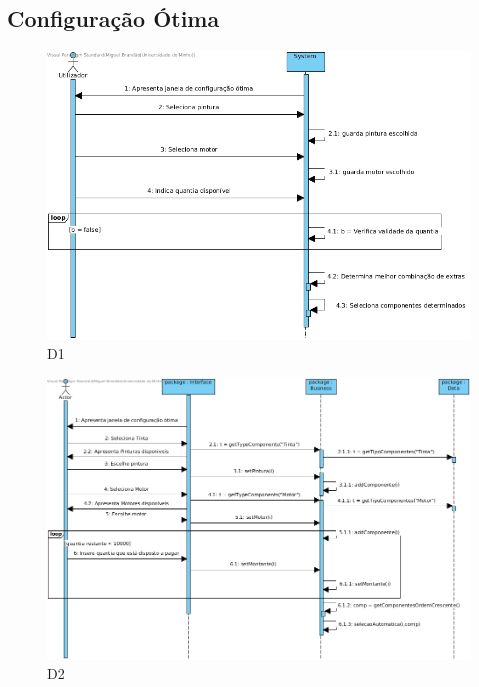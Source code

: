 \subsection{Configuração Ótima}

\begin{figure}[H]
    \centering
    \includegraphics[width=\textwidth]{diagramas_de_sequencia/imgs/UserSystemUC10D1.jpg}
    \caption{D1}
\end{figure}
\begin{figure}[H]
    \centering
    \includegraphics[width=\textwidth]{diagramas_de_sequencia/imgs/UserSystemUC10D2.jpg}
    \caption{D2}
\end{figure}
